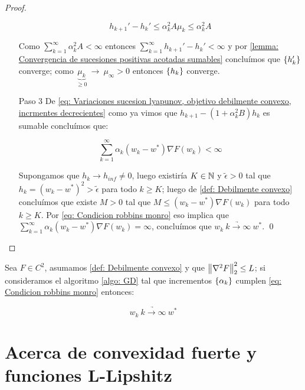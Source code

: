 \begin{proof}
\begin{enumerate}
		\begin{equation*}
			h_{k+1}' - h_{k}' \leq \alpha_k^2 A \mu_k \leq \alpha_k^2 A
		\end{equation*}
		
		Como $\sum\limits_{k=1}^{\infty} {\alpha_k^2 A} < \infty$ entonces $\sum\limits_{k=1}^{\infty}{h_{k+1}' - h_{k}'} < \infty$ y por \ref{lemma: Convergencia de sucesiones positivas acotadas sumables} conclu\'imos que $\left\lbrace h_k'\right\rbrace$ converge; como $\underbrace{\mu_k}_{\geq 0} \ \rightarrow \ \mu_{\infty} > 0$ entonces $\left\lbrace h_k\right\rbrace$ converge.
		
		\item[Paso 3] De \ref{eq: Variaciones sucesion lyapunov, objetivo debilmente convexo, incrmentes decrecientes} como ya vimos que $	h_{k+1} - \left(1 + \alpha_k^2 B\right)h_k$ es sumable conclu\'imos que:
		
		\begin{equation*}
			\sum\limits_{k=1}^{\infty} {\alpha_k \left(w_k - w^* \right)\nabla F(w_k)} < \infty
		\end{equation*}
		
		Supongamos que $h_k \rightarrow h_{inf} \neq 0$, luego existir\'ia $K\in {\mathbb{N}}$ y $\widetilde{\epsilon} >0$ tal que $h_k = \left(w_k - w^*\right)^2 > \widetilde{\epsilon}$ para todo $k \geq K$; luego de \ref{def: Debilmente convexo} conclu\'imos que existe $M > 0$ tal que $M \leq \left(w_k - w^* \right)\nabla F(w_k) $ para todo $k \geq K$. Por \ref{eq: Condicion robbins monro} eso implica que $\sum\limits_{k=1}^{\infty} {\alpha_k \left(w_k - w^* \right)\nabla F(w_k)} = \infty$, conclu\'imos que $w_k \ \underrightarrow{k \rightarrow \infty} \ w^*$. \qed
		
	\end{enumerate}
	
\end{proof}

\begin{corollary}
	Sea $F \in C^2$, asumamos \ref{def: Debilmente convexo} y que $\left\lVert\nabla^2 F\right\rVert_2^2 \leq L$; si consideramos el algoritmo \ref{algo: GD} tal que incrementos $\left\lbrace\alpha_k\right\rbrace$  cumplen \ref{eq: Condicion robbins monro} entonces:
	
	\begin{equation}
	w_k \ \underrightarrow{k \rightarrow \infty} \ w^*
	\end{equation}
\end{corollary}

\section{Acerca de convexidad fuerte y funciones L-Lipshitz}

